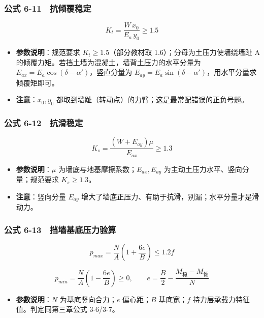 \documentclass[
]{article}
\providecommand{\tightlist}{%
  \setlength{\itemsep}{0pt}\setlength{\parskip}{0pt}}
\begin{document}
\subsubsection{公式
6-11　抗倾覆稳定}\label{ux516cux5f0f-6-11-ux6297ux503eux8986ux7a33ux5b9a}

\[K_t=\frac{W\,x_0}{E_a\,y_0}\ge1.5\]

\begin{itemize}
\tightlist
\item
  \textbf{参数说明}：规范要求 \(K_t\ge1.5\)（部分教材取
  1.6）；分母为土压力使墙绕墙趾 A
  的倾覆力矩。若挡土墙为混凝土，墙背土压力的水平分量为
  \(E_{ax}=E_a\cos(\delta-\alpha')\)，竖直分量为
  \(E_{ay}=E_a\sin(\delta-\alpha')\)，用水平分量求倾覆矩即可。
\item
  \textbf{注意}：\(x_0,y_0\)
  都取到墙趾（转动点）的力臂；这是最常配错误的正负号题。
\end{itemize}

\subsubsection{公式
6-12　抗滑稳定}\label{ux516cux5f0f-6-12-ux6297ux6ed1ux7a33ux5b9a}

\[K_s=\frac{(W+E_{ay})\mu}{E_{ax}}\ge1.3\]

\begin{itemize}
\tightlist
\item
  \textbf{参数说明}：\(\mu\) 为墙底与地基摩擦系数；\(E_{ax},E_{ay}\)
  为主动土压力水平、竖向分量；规范要求 \(K_s\ge1.3\)。
\item
  \textbf{注意}：竖向分量 \(E_{ay}\)
  增大了墙底正压力、有助于抗滑，别漏；水平分量才是滑动力。
\end{itemize}

\subsubsection{公式
6-13　挡墙基底压力验算}\label{ux516cux5f0f-6-13-ux6321ux5899ux57faux5e95ux538bux529bux9a8cux7b97}

\[p_{max}=\frac{N}{A}\left(1+\frac{6e}{B}\right)\le1.2f\]

\[p_{min}=\frac{N}{A}\left(1-\frac{6e}{B}\right)\ge0,\qquad e=\frac{B}{2}-\frac{M_{稳}-M_{倾}}{N}\]

\begin{itemize}
\tightlist
\item
  \textbf{参数说明}：\(N\) 为基底竖向合力；\(e\) 偏心距；\(B\)
  基底宽；\(f\) 持力层承载力特征值。判定同第三章公式 3-6/3-7。
\end{itemize}
\end{document}
